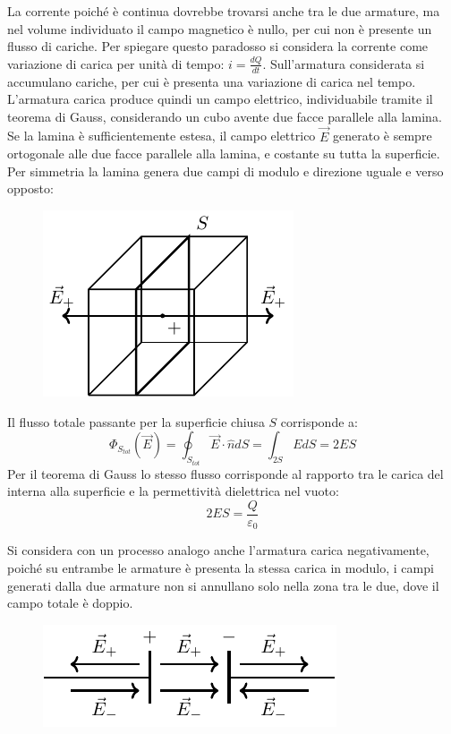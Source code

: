 \documentclass{article}
\numberwithin{equation}{subsection}
\begin{document}
La corrente poiché è continua dovrebbe trovarsi anche tra le due armature, ma nel volume individuato il campo magnetico è nullo, per cui non è presente un flusso di cariche. 
Per spiegare questo paradosso si considera la corrente come variazione di carica per unità di tempo: $i=\displaystyle\frac{dQ}{dt}$. Sull'armatura considerata si accumulano 
cariche, per cui è presenta una variazione di carica nel tempo. L'armatura carica produce quindi un campo elettrico, individuabile tramite il teorema di Gauss, considerando un 
cubo avente due facce parallele alla lamina. Se la lamina è sufficientemente estesa, il campo elettrico $\vec{E}$ generato è sempre ortogonale alle due facce parallele 
alla lamina, e costante su tutta la superficie. Per simmetria la lamina genera due campi di modulo e direzione uguale e verso opposto:

\begin{figure}[H]%
    \centering
    \includegraphics{flusso-lamina.pdf}
    \label{fig:flusso-lamina}
\end{figure}

Il flusso totale passante per la superficie chiusa $S$ corrisponde a:
\begin{equation*}
    \Phi_{S_{tot}}(\vec{E})=\displaystyle\oint_{S_{tot}}\vec{E}\cdot\hat{n}dS=\int_{2S}EdS=2ES
\end{equation*}
Per il teorema di Gauss lo stesso flusso corrisponde al rapporto tra le carica del interna alla superficie e la permettività dielettrica nel vuoto:
\begin{equation*}
    2ES=\displaystyle\frac{Q}{\varepsilon_0}
\end{equation*}

Si considera con un processo analogo anche l'armatura carica negativamente, poiché su entrambe le armature è presenta la stessa carica in modulo, i campi generati dalla due 
armature non si annullano solo nella zona tra le due, dove il campo totale è doppio. 
\begin{figure}[H]%
    \centering
    \includegraphics{campo-elettrico-filo-reciso.pdf}
    \label{fig:campo-elettrico-filo-reciso}
\end{figure}
\end{document}

